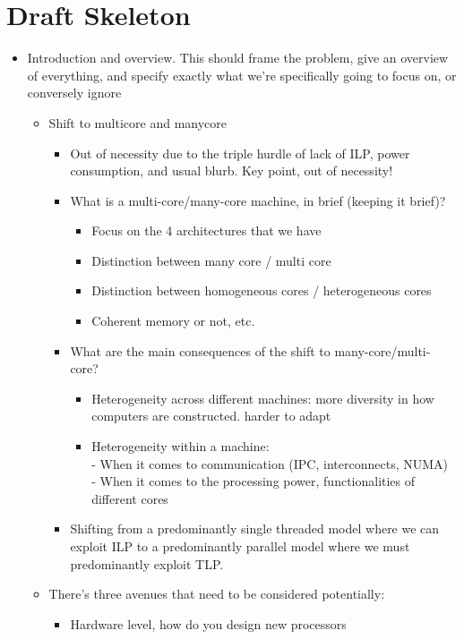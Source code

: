 \section{Draft Skeleton}
\begin{itemize} 
\item Introduction and overview. This should frame the problem,
give an overview of everything, and specify exactly what we're specifically
going to focus on, or conversely ignore
\begin{itemize}
\item Shift to multicore and manycore
\begin{itemize}
\item Out of necessity due to the triple hurdle of lack of ILP, power consumption,
and usual blurb. Key point, out of necessity!
\item What is a multi-core/many-core machine, in brief (keeping it brief)?
\begin{itemize}
\item Focus on the 4 architectures that we have
\item Distinction between many core / multi core
\item Distinction between homogeneous cores / heterogeneous cores
\item Coherent memory or not, etc. 
\end{itemize}
\item What are the main consequences of the shift to many-core/multi-core?
\begin{itemize}
\item Heterogeneity across different machines: more diversity in how 
computers are constructed. harder to adapt
\item Heterogeneity within a machine: \\
- When it comes to communication (IPC, interconnects, NUMA) \\ 
- When it comes to the processing power, functionalities of 
different cores \\
\end{itemize}
\item Shifting from a predominantly single threaded model where we can exploit
ILP to a predominantly parallel model where we must predominantly exploit TLP. 
\end{itemize}
\item There's three avenues that need to be considered potentially:
\begin{itemize}
\item Hardware level, how do you design new processors

\end{itemize}
\end{itemize}
\end{itemize}
